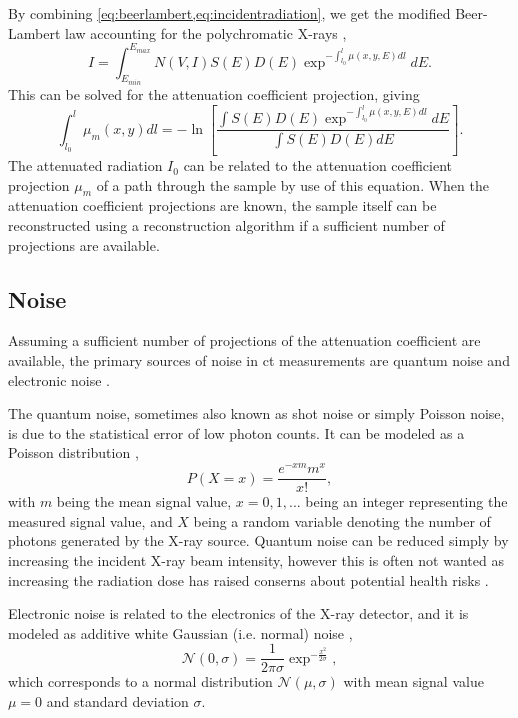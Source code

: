 By combining \cref{eq:beerlambert,eq:incidentradiation}, we get the modified Beer-Lambert law accounting for the polychromatic X-rays \cite{doi:10.1063/1.4950807}, 
\begin{equation}
    I = \int_{E_{min}}^{E_{max}}N\left(V,I\right)S\left(E\right)D\left(E\right)\exp^{-\int_{l_0}^{l}\mu\left(x,y,E\right)dl}dE.
\end{equation}
This can be solved for the attenuation coefficient projection, giving \cite{doi:10.1063/1.4950807}
\begin{equation}
    \label{eq:ctattenuationcoefficient}
    \int_{l_0}^{l} \mu_m\left(x,y\right)dl = -\ln\left[\frac{\int S\left(E\right) D\left(E\right)\exp^{-\int_{l_0}^{l}\mu\left(x,y,E\right)dl} dE }{ \int S\left(E\right) D\left(E\right) dE }\right].
\end{equation}
The attenuated radiation $I_0$ can be related to the attenuation coefficient projection $\mu_m$ of a path through the sample by use of this equation. When the attenuation coefficient projections are known, the sample itself can be reconstructed using a reconstruction algorithm if a sufficient number of projections are available. 

\subsection{Noise}
Assuming a sufficient number of projections of the attenuation coefficient are available, the primary sources of noise in \acrshort{ct} measurements are quantum noise and electronic noise \cite{boas2012ct}. 

The quantum noise, sometimes also known as shot noise or simply Poisson noise, is due to the statistical error of low photon counts. It can be modeled as a Poisson distribution \cite{Whiting2006},
\begin{equation}
    \label{eq:poissonnoise}
    P(X = x) = \frac{e^{-xm}m^x}{x!},
\end{equation}
with $m$ being the mean signal value, $x=0,1,...$ being an integer representing the measured signal value, and $X$ being a random variable denoting the number of photons generated by the X-ray source. Quantum noise can be reduced simply by increasing the incident X-ray beam intensity, however this is often not wanted as increasing the radiation dose has raised conserns about potential health risks \cite{doi:10.1056/NEJMra072149,PEARCE2012499}. 

Electronic noise is related to the electronics of the X-ray detector, and it is modeled as additive white Gaussian (i.e. normal) noise \cite{boas2012ct},
\begin{equation}
    \mathcal{N}\left(0,\sigma \right) = \frac{1}{2\pi\sigma}\exp^{-\frac{x^2}{2\sigma}},
\end{equation}
which corresponds to a normal distribution $\mathcal{N}\left(\mu,\sigma\right)$ with mean signal value $\mu=0$ and standard deviation $\sigma$. 

